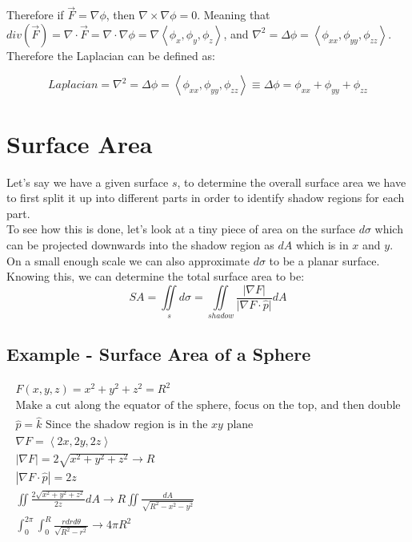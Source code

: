 \documentclass{article}
\newcommand{\nvec}[1]{\left\langle #1 \right\rangle}
\newcommand{\abs}[1]{\left\lvert #1 \right\rvert}
\begin{document}
Therefore if $\vec{F}=\nabla\phi$, then $\nabla \times \nabla\phi = 0$. Meaning that $div(\vec{F}) = \nabla \cdot \vec{F} = \nabla \cdot \nabla\phi = \nabla \nvec{\phi_x, \phi_y, \phi_z}$, and $\nabla^2 = \Delta\phi = \nvec{\phi_{xx}, \phi_{yy}, \phi_{zz} }$. Therefore the Laplacian can be defined as:

\begin{equation}
Laplacian=\nabla^2 = \Delta\phi = \nvec{\phi_{xx}, \phi_{yy}, \phi_{zz} } \equiv \Delta \phi = \phi_{xx} + \phi_{yy} + \phi_{zz}
\end{equation}

\section{Surface Area}
Let's say we have a given surface $s$, to determine the overall surface area we have to first split it up into different parts in order to identify shadow regions for each part.\\

To see how this is done, let's look at a tiny piece of area on the surface $d \sigma$ which can be projected downwards into the shadow region as $dA$ which is in $x$ and $y$. On a small enough scale we can also approximate $d \sigma$ to be a planar surface.\\

Knowing this, we can determine the total surface area to be:
\[
SA = \iint\limits_s d \sigma = \iint\limits_{shadow} \frac{\lvert \nabla F \rvert}{\lvert \nabla F \cdot \hat{p} \rvert} dA
\]

    \subsection{Example - Surface Area of a Sphere}

    \[
    \begin{aligned}
    F(x,y,z) = x^2 + y^2 + z^2 = R^2\\
    \text{Make a cut along the equator of the sphere, focus on the top, and then double}\\
    \hat{p} = \hat{k} \text{ Since the shadow region is in the $xy$ plane}\\
    \nabla F = \nvec{2x, 2y, 2z}\\
    \abs{\nabla F} = 2 \sqrt{x^2 + y^2 + z^2} \to R\\
    \abs{\nabla F \cdot \hat{p} } = 2z\\
    \iint \frac{2 \sqrt{x^2 + y^2 + z^2} }{2z} dA \to R \iint \frac{dA}{\sqrt{R^2 - x^2 - y^2} }\\
    \int_0^{2\pi} \int_0^R \frac{rdrd\theta}{\sqrt{R^2 - r^2} } \to 4\pi R^2
    \end{aligned}
    \]
\end{document}
